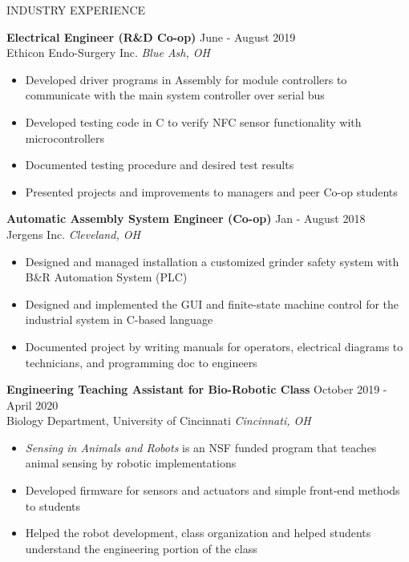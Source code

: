 \documentclass{../lib/resume} %
\begin{document}
	\begin{rSection}{INDUSTRY EXPERIENCE}
		
		\textbf{Electrical Engineer (R\&D Co-op)} \hfill June - August 2019\\
		Ethicon Endo-Surgery Inc. \hfill \textit{Blue Ash, OH}
		\begin{itemize}
			\itemsep -4pt {} 
			\item Developed driver programs in Assembly for module controllers to communicate with the main system controller over serial bus
			\item Developed testing code in C to verify NFC sensor functionality with microcontrollers
			\item Documented testing procedure and desired test results
			\item Presented projects and improvements to managers and peer Co-op students
		\end{itemize}
		
		\textbf{Automatic Assembly System Engineer (Co-op)} \hfill Jan - August 2018
		\\	Jergens Inc. \hfill \textit{Cleveland, OH}
		\begin{itemize}
			\itemsep -4pt {} 
			\item Designed and managed installation a customized grinder safety system with B\&R Automation System (PLC)
			\item Designed and implemented the GUI and finite-state machine control for the industrial system in C-based language
			\item Documented project by writing manuals for operators, electrical diagrams to technicians, and programming doc to engineers
		\end{itemize}
		
		
		\textbf{Engineering Teaching Assistant for Bio-Robotic Class} \hfill October 2019 - April 2020\\
		Biology Department, University of Cincinnati \hfill \textit{Cincinnati, OH}
		\begin{itemize}
			\itemsep -4pt {} 
			\item \textit{Sensing in Animals and Robots} is an NSF funded program that teaches animal sensing by robotic implementations
			\item Developed firmware for sensors and actuators and simple front-end methods to students
			\item Helped the robot development, class organization and helped students understand the engineering portion of the class
			
		\end{itemize}
	\end{rSection} 
	
\end{document}
